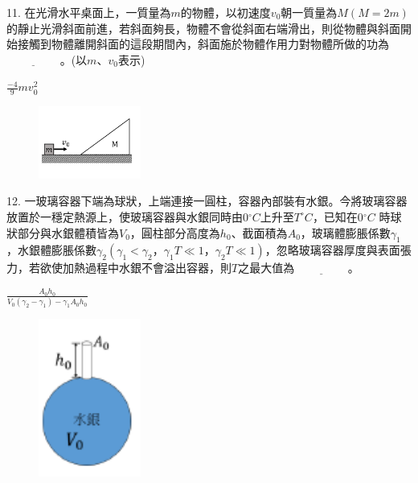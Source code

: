 \documentclass[cn,10pt,math=newtx]{elegantbook}
\begin{document}
\begin{example}
   11. 在光滑水平桌面上，一質量為$m$的物體，以初速度$v_0$朝一質量為$M(M=2m)$的靜止光滑斜面前進，若斜面夠長，物體不會從斜面右端滑出，則從物體與斜面開始接觸到物體離開斜面的這段期間內，斜面施於物體作用力對物體所做的功為$\underline{\hspace{2cm}}$。(以$m、v_0$表示)\\
    \rightline{[桃園高中教甄109]}
\end{example}
\begin{solution}
    $\frac{-4}{9} m v^2_0$
\end{solution}
\begin{figure}[htbp]
    \flushright
    \includegraphics[width=0.3\textwidth]{image/109桃園11.png}
  \end{figure}
\newpage


\begin{example}
   12. 一玻璃容器下端為球狀，上端連接一圓柱，容器內部裝有水銀。今將玻璃容器放置於一穩定熱源上，使玻璃容器與水銀同時由0$^\circ C$上升至$T^\circ C$，已知在0$^\circ C$ 時球狀部分與水銀體積皆為$V_0$，圓柱部分高度為$ℎ_0$、截面積為$A_0$，玻璃體膨脹係數$\gamma_1$，水銀體膨脹係數$\gamma_2(\gamma_1<\gamma_2 ， \gamma_1 T\ll1 ， \gamma_2 T\ll 1)$，忽略玻璃容器厚度與表面張力，若欲使加熱過程中水銀不會溢出容器，則$T$之最大值為$\underline{\hspace{2cm}}$。\\
    \rightline{[桃園高中教甄109]}
\end{example}
\begin{solution}
    $\frac{A_0 h_0} {V_0 (\gamma_2 -\gamma_1) - \gamma_1 A_0 h_0}$
\end{solution}
\begin{figure}[htbp]
    \flushright
    \includegraphics[width=0.3\textwidth]{image/109桃園12.png}
  \end{figure}
\newpage
\end{document}
